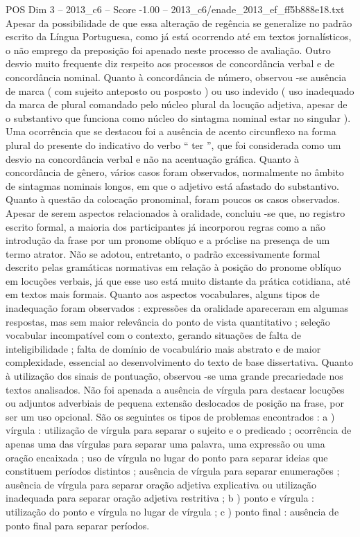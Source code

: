 \begin{textsample}{POS Dim 3 – 2013\_c6 – Score -1.00 – 2013\_c6/enade\_2013\_ef\_ff5b888e18.txt}
Apesar da possibilidade de que essa alteração de regência se generalize no padrão escrito da Língua Portuguesa, como já está ocorrendo até em textos jornalísticos, o não emprego da preposição foi apenado neste processo de avaliação.
Outro desvio muito frequente diz respeito aos processos de concordância verbal e de concordância nominal.
Quanto à concordância de número, observou -se ausência de marca ( com sujeito anteposto ou posposto ) ou uso indevido ( uso inadequado da marca de plural comandado pelo núcleo plural da locução adjetiva, apesar de o substantivo que funciona como núcleo do sintagma nominal estar no singular ).
Uma ocorrência que se destacou foi a ausência de acento circunflexo na forma plural do presente do indicativo do verbo “ ter ”, que foi considerada como um desvio na concordância verbal e não na acentuação gráfica.
Quanto à concordância de gênero, vários casos foram observados, normalmente no âmbito de sintagmas nominais longos, em que o adjetivo está afastado do substantivo.
Quanto à questão da colocação pronominal, foram poucos os casos observados.
Apesar de serem aspectos relacionados à oralidade, concluiu -se que, no registro escrito formal, a maioria dos participantes já incorporou regras como a não introdução da frase por um pronome oblíquo e a próclise na presença de um termo atrator.
Não se adotou, entretanto, o padrão excessivamente formal descrito pelas gramáticas normativas em relação à posição do pronome oblíquo em locuções verbais, já que esse uso está muito distante da prática cotidiana, até em textos mais formais.
Quanto aos aspectos vocabulares, alguns tipos de inadequação foram observados : expressões da oralidade apareceram em algumas respostas, mas sem maior relevância do ponto de vista quantitativo ; seleção vocabular incompatível com o contexto, gerando situações de falta de inteligibilidade ; falta de domínio de vocabulário mais abstrato e de maior complexidade, essencial ao desenvolvimento do texto de base dissertativa.
Quanto à utilização dos sinais de pontuação, observou -se uma grande precariedade nos textos analisados.
Não foi apenada a ausência de vírgula para destacar locuções ou adjuntos adverbiais de pequena extensão deslocados de posição na frase, por ser um uso opcional.
São os seguintes os tipos de problemas encontrados : a ) vírgula : utilização de vírgula para separar o sujeito e o predicado ; ocorrência de apenas uma das vírgulas para separar uma palavra, uma expressão ou uma oração encaixada ; uso de vírgula no lugar do ponto para separar ideias que constituem períodos distintos ; ausência de vírgula para separar enumerações ; ausência de vírgula para separar oração adjetiva explicativa ou utilização inadequada para separar oração adjetiva restritiva ; b ) ponto e vírgula : utilização do ponto e vírgula no lugar de vírgula ; c ) ponto final : ausência de ponto final para separar períodos.

\end{textsample}
